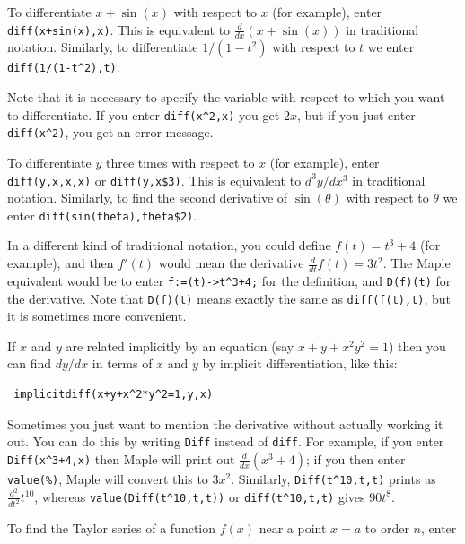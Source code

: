 \documentclass{amsart}
\begin{document}
\begin{secenum}
%
 \item\label{diff} To differentiate $x+\sin(x)$ with respect to $x$ (for
  example), enter \verb~diff(x+sin(x),x)~.  This is
  equivalent to $\frac{d}{dx}(x+\sin(x))$ in traditional
  notation.  Similarly, to differentiate $1/(1-t^2)$ with
  respect to $t$ we enter \verb~diff(1/(1-t^2),t)~.  
%
 \item\label{diffvar} Note that it is necessary to specify the
  variable with respect to which you want to differentiate. 
  If you enter \verb~diff(x^2,x)~ you get $2x$, but if you
  just enter \verb~diff(x^2)~, you get an error message. 
%
 \item\label{multidiff} To differentiate $y$ three times with respect to $x$
  (for example), enter \verb~diff(y,x,x,x)~ or
  \verb~diff(y,x$3)~.  This is equivalent to $d^3y/dx^3$ in
  traditional notation.  Similarly, to find the second
  derivative of $\sin(\theta)$ with respect to $\theta$ we
  enter \verb~diff(sin(theta),theta$2)~. 
%
 \item\label{leibniz} In a different kind of traditional notation, you
  could define $f(t)=t^3+4$ (for example), and then $f'(t)$
  would mean the derivative $\frac{d}{dt}f(t)=3t^2$.  The
  Maple equivalent would be to enter \verb~f:=(t)->t^3+4;~
  for the definition, and \verb~D(f)(t)~ for the derivative. 
  Note that \verb~D(f)(t)~ means exactly the same as
  \verb~diff(f(t),t)~, but it is sometimes more convenient. 
%
 \item\label{implicitdiff} If $x$ and $y$ are related implicitly
  by an equation (say $x+y+x^2y^2=1$) then you can find
  $dy/dx$ in terms of $x$ and $y$ by implicit
  differentiation, like this: 
\begin{verbatim}
 implicitdiff(x+y+x^2*y^2=1,y,x)
\end{verbatim}
%
 \item\label{inertdiff} Sometimes you just want to mention the derivative
  without actually working it out.  You can do this by
  writing \verb~Diff~ instead of \verb~diff~.  For example,
  if you enter \verb~Diff(x^3+4,x)~ then Maple will print
  out $\frac{d}{dx}(x^3+4)$; if you then enter
  \verb~value(%)~, Maple will convert this to $3x^2$. 
  Similarly, \verb~Diff(t^10,t,t)~ prints as
  $\frac{d^2}{dt^2}t^{10}$, whereas
  \verb~value(Diff(t^10,t,t))~ or \verb~diff(t^10,t,t)~
  gives $90 t^8$. 
%
 \item\label{taylor} To find the Taylor series of a function $f(x)$ near a
  point $x=a$ to order $n$, enter

\end{secenum}
\end{document}
